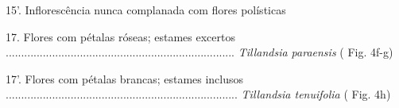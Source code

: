 \begin{customList1}
\begin{customList1}
\begin{customList1}
\begin{customList1}
\begin{customList1}
\begin{customList1}
\begin{customList1}
\item \par{}15'.\allowbreak{} Inflorescência nunca complanada com flores polísticas
\begin{customList1}
\item \par{}17.\allowbreak{} Flores com pétalas róseas; estames excertos .\allowbreak{}.\allowbreak{}.\allowbreak{}.\allowbreak{}.\allowbreak{}.\allowbreak{}.\allowbreak{}.\allowbreak{}.\allowbreak{}.\allowbreak{}.\allowbreak{}.\allowbreak{}.\allowbreak{}.\allowbreak{}.\allowbreak{}.\allowbreak{}.\allowbreak{}.\allowbreak{}.\allowbreak{}.\allowbreak{}.\allowbreak{}.\allowbreak{}.\allowbreak{}.\allowbreak{}.\allowbreak{}.\allowbreak{}.\allowbreak{}.\allowbreak{}.\allowbreak{}.\allowbreak{}.\allowbreak{}.\allowbreak{}.\allowbreak{}.\allowbreak{}.\allowbreak{}.\allowbreak{}.\allowbreak{}.\allowbreak{}.\allowbreak{}.\allowbreak{}.\allowbreak{}.\allowbreak{}.\allowbreak{}.\allowbreak{}.\allowbreak{}.\allowbreak{}.\allowbreak{}.\allowbreak{}.\allowbreak{}.\allowbreak{}.\allowbreak{}.\allowbreak{}.\allowbreak{}.\allowbreak{}.\allowbreak{}.\allowbreak{}.\allowbreak{}.\allowbreak{}.\allowbreak{}.\allowbreak{}.\allowbreak{}.\allowbreak{}.\allowbreak{}.\allowbreak{}.\allowbreak{}.\allowbreak{}.\allowbreak{}.\allowbreak{}.\allowbreak{}.\allowbreak{}.\allowbreak{}.\allowbreak{}.\allowbreak{}.\allowbreak{} \textit{Tillandsia paraensis} (\allowbreak{} Fig.\allowbreak{} 4f-\allowbreak{}g)\allowbreak{}
\item \par{}17'.\allowbreak{} Flores com pétalas brancas; estames inclusos .\allowbreak{}.\allowbreak{}.\allowbreak{}.\allowbreak{}.\allowbreak{}.\allowbreak{}.\allowbreak{}.\allowbreak{}.\allowbreak{}.\allowbreak{}.\allowbreak{}.\allowbreak{}.\allowbreak{}.\allowbreak{}.\allowbreak{}.\allowbreak{}.\allowbreak{}.\allowbreak{}.\allowbreak{}.\allowbreak{}.\allowbreak{}.\allowbreak{}.\allowbreak{}.\allowbreak{}.\allowbreak{}.\allowbreak{}.\allowbreak{}.\allowbreak{}.\allowbreak{}.\allowbreak{}.\allowbreak{}.\allowbreak{}.\allowbreak{}.\allowbreak{}.\allowbreak{}.\allowbreak{}.\allowbreak{}.\allowbreak{}.\allowbreak{}.\allowbreak{}.\allowbreak{}.\allowbreak{}.\allowbreak{}.\allowbreak{}.\allowbreak{}.\allowbreak{}.\allowbreak{}.\allowbreak{}.\allowbreak{}.\allowbreak{}.\allowbreak{}.\allowbreak{}.\allowbreak{}.\allowbreak{}.\allowbreak{}.\allowbreak{}.\allowbreak{}.\allowbreak{}.\allowbreak{}.\allowbreak{}.\allowbreak{}.\allowbreak{}.\allowbreak{}.\allowbreak{}.\allowbreak{}.\allowbreak{}.\allowbreak{}.\allowbreak{}.\allowbreak{}.\allowbreak{}.\allowbreak{}.\allowbreak{}.\allowbreak{}.\allowbreak{}.\allowbreak{} \textit{Tillandsia tenuifolia} (\allowbreak{} Fig.\allowbreak{} 4h)\allowbreak{}
\end{customList1}


\end{customList1}
\end{customList1}
\end{customList1}
\end{customList1}
\end{customList1}
\end{customList1}
\end{customList1}
